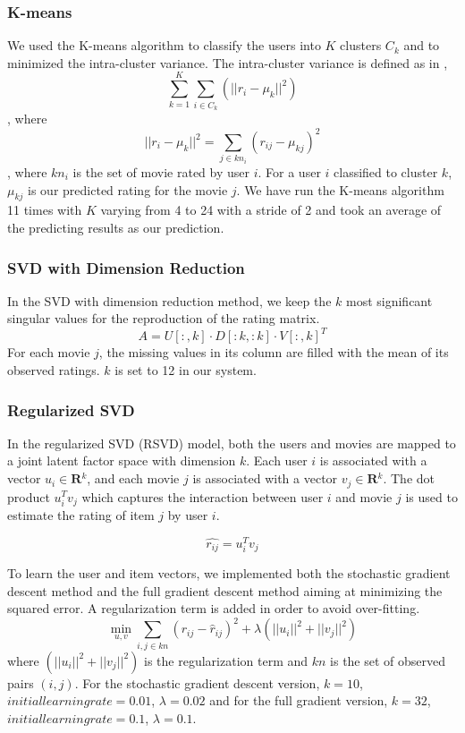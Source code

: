 \documentclass[10pt,conference,compsocconf]{IEEEtran}
\begin{document}
\subsubsection{K-means}
We used the K-means algorithm to classify the users into $K$ clusters $C_k$ and to minimized the intra-cluster variance. The intra-cluster variance is defined as in \cite{Paterek2007Improving}, $$   \sum_{k=1}^K \sum_{i \in C_k} (||r_{i}-\mu_k||^2)  $$, where $$  ||r_{i}-\mu_k||^2 = \sum_{j \in kn_i}(r_{ij}-\mu_{kj})^2  $$, where $kn_i$ is the set of movie rated by user $i$.
 For a user $i$ classified to cluster $k$, $\mu_{kj}$ is our predicted rating for the movie $j$. We have run the K-means algorithm 11 times with $K$ varying from 4 to 24 with a stride of 2 and took an average of the predicting results as our prediction.

\subsubsection{SVD with Dimension Reduction}
In the SVD with dimension reduction method, we keep the $k$ most significant singular values for the reproduction of the rating matrix. 
\[A = U[:,k] \cdot D[:k,:k] \cdot V{[:,k]^T}\]
For each movie $j$, the missing values in its column are filled with the mean of its observed ratings. $k$ is set to 12 in our system.

\subsubsection{Regularized SVD}
In the regularized SVD (RSVD) model, both the users and movies are mapped to a joint latent factor space with dimension $k$. Each user $i$ is associated with a vector $u_{i} \in \textbf{R$^k$}$, and each movie $j$ is associated with a vector $v_{j} \in \textbf{R$^k$} $. The dot product $u_i^Tv_j$ which captures the interaction between user $i$ and movie $j$ is used to estimate the rating of item $j$ by user $i$.

$$ \hat{r_{ij}}=u_{i}^{T}v_{j} $$

To learn the user and item vectors, we implemented both the stochastic gradient descent method and the full gradient descent method aiming at minimizing the squared error. A regularization term is added in order to avoid over-fitting.
$$  \min \limits_{u, v} \sum_{i, j\in kn} (r_{ij} - \hat r_{ij})^2 + \lambda (||u_i||^2 + ||v_j||^2)  $$
where $ (||u_i||^2 + ||v_j||^2)$ is the regularization term and $kn$ is the set of observed pairs $(i, j)$. For the stochastic gradient descent version, $k=10$, $initial learning rate=0.01$, $\lambda=0.02$ and for the full gradient version, $k=32$, $initial learning rate=0.1$, $\lambda=0.1$.
\end{document}

